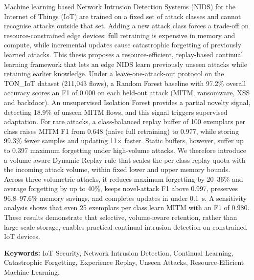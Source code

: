\documentclass[12pt,a4paper,oneside]{report}
\begin{document}
Machine learning based Network Intrusion Detection Systems (NIDS) for the Internet of Things (IoT) are trained on a fixed set of attack classes and cannot recognise attacks outside that set. Adding a new attack class forces a trade-off on resource-constrained edge devices: full retraining is expensive in memory and compute, while incremental updates cause catastrophic forgetting of previously learned attacks. This thesis proposes a resource-efficient, replay-based continual learning framework that lets an edge NIDS learn previously unseen attacks while retaining earlier knowledge. Under a leave-one-attack-out protocol on the TON\_IoT dataset (211{,}043 flows), a Random Forest baseline with 97.2\% overall accuracy scores an F1 of 0.000 on each held-out attack (MITM, ransomware, XSS and backdoor). An unsupervised Isolation Forest provides a partial novelty signal, detecting 18.9\% of unseen MITM flows, and this signal triggers supervised adaptation. For rare attacks, a class-balanced replay buffer of 100 exemplars per class raises MITM F1 from 0.648 (naïve full retraining) to 0.977, while storing 99.3\% fewer samples and updating 11$\times$ faster. Static buffers, however, suffer up to 0.397 maximum forgetting under high-volume attacks. We therefore introduce a volume-aware Dynamic Replay rule that scales the per-class replay quota with the incoming attack volume, within fixed lower and upper memory bounds. Across three volumetric attacks, it reduces maximum forgetting by 20--36\% and average forgetting by up to 40\%, keeps novel-attack F1 above 0.997, preserves 96.8--97.6\% memory savings, and completes updates in under 0.1~s. A sensitivity analysis shows that even 25 exemplars per class learn MITM with an F1 of 0.980. These results demonstrate that selective, volume-aware retention, rather than large-scale storage, enables practical continual intrusion detection on constrained IoT devices.

\vspace{1cm}
\noindent \textbf{Keywords:} IoT Security, Network Intrusion Detection, Continual Learning, Catastrophic Forgetting, Experience Replay, Unseen Attacks, Resource-Efficient Machine Learning.

\newpage
\tableofcontents

\newpage
\listoffigures

\newpage
\listoftables

\newpage
{}
\end{document}
